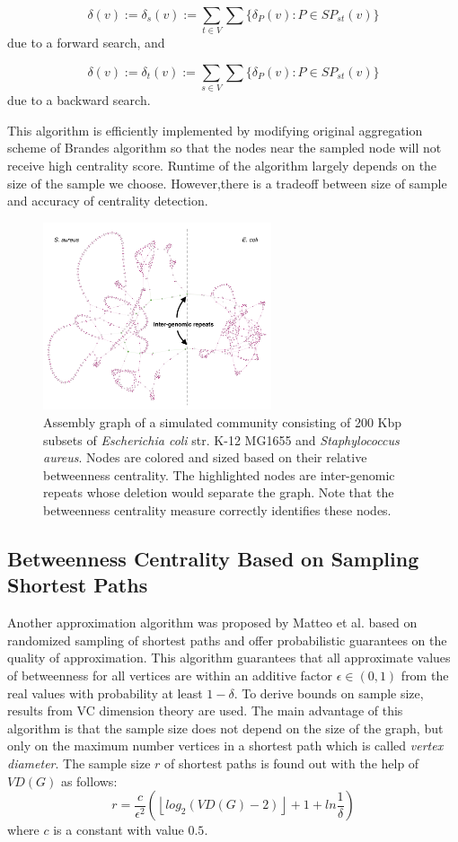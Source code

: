 \documentclass[runningheads,a4paper]{llncs}
\begin{document}
$$\delta(v) := \delta_{s}(v) := \sum_{t \in V}\sum \{\delta_{P}(v):  P \in SP_{st}(v)\}$$
due to a forward search, and 

$$\delta(v) := \delta_{t}(v) := \sum_{s \in V}\sum \{\delta_{P}(v):  P \in SP_{st}(v)\}$$
due to a backward search. 

This algorithm is efficiently implemented by modifying original aggregation scheme of Brandes algorithm so that the nodes near the sampled node will not receive high centrality score. Runtime of the algorithm largely depends on the size of the sample we choose. However,there is a tradeoff between size of sample and accuracy of centrality detection.  



\begin{figure}[htbp]
\centering
\includegraphics[width=0.60\textwidth]{es_mix_200kb_k21.png}
\caption{Assembly graph of a simulated community consisting of 200 Kbp subsets of \textit{Escherichia coli} str. K-12 MG1655 and \textit{Staphylococcus aureus}.  Nodes are colored and sized based on their relative betweenness centrality. The highlighted nodes are inter-genomic repeats whose deletion would separate the graph. Note that the betweenness centrality measure correctly identifies these nodes.}
\label{fig:sampled_nodes}
\end{figure}


\subsection*{Betweenness Centrality Based on Sampling Shortest Paths}
Another approximation algorithm was proposed by Matteo et al. \cite{matteo} based on randomized sampling of shortest paths and offer probabilistic guarantees on the quality of approximation. This algorithm guarantees that all approximate values of betweenness for all vertices are within an additive factor $\epsilon \in (0,1)$ from the real values with probability at least $1-\delta$. To derive bounds on sample size, results from VC dimension theory\cite{vc} are used. The main advantage of this algorithm is that the sample size does not depend on the size of the graph, but only on the maximum number vertices in a shortest path which is called \textit{vertex diameter}. The sample size $r$ of shortest paths is found out with the help of $VD(G)$ as follows:
\begin{equation} \label{sample_size_algo}
r = \frac{c}{\epsilon^{2}}(\left\lfloor{log_{2}(VD(G) - 2)}\right\rfloor + 1 + ln\frac{1}{\delta})
\end{equation} 
where $c$ is a constant with value $0.5$. 
\end{document}

